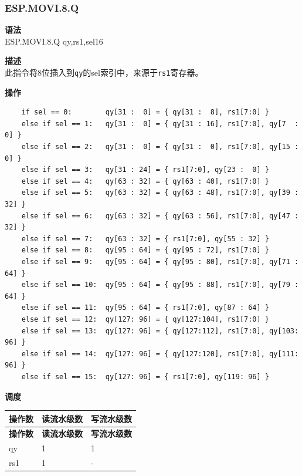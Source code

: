 \newpage

\newpage
\subsubsection{ESP.MOVI.8.Q}\label{instruction:ESPMOVI8Q}
\textbf{语法}\\
ESP.MOVI.8.Q qy,rs1,sel16

\textbf{描述}\\
此指令将8位插入到\lstinline{qy}的sel索引中，来源于\lstinline{rs1}寄存器。

\textbf{操作}\\
\begin{lstlisting}
    if sel == 0:        qy[31 :  0] = { qy[31 :  8], rs1[7:0] }
    else if sel == 1:   qy[31 :  0] = { qy[31 : 16], rs1[7:0], qy[7  :  0] }
    else if sel == 2:   qy[31 :  0] = { qy[31 :  0], rs1[7:0], qy[15 :  0] }
    else if sel == 3:   qy[31 : 24] = { rs1[7:0], qy[23 :  0] }
    else if sel == 4:   qy[63 : 32] = { qy[63 : 40], rs1[7:0] }
    else if sel == 5:   qy[63 : 32] = { qy[63 : 48], rs1[7:0], qy[39 : 32] }
    else if sel == 6:   qy[63 : 32] = { qy[63 : 56], rs1[7:0], qy[47 : 32] }
    else if sel == 7:   qy[63 : 32] = { rs1[7:0], qy[55 : 32] }
    else if sel == 8:   qy[95 : 64] = { qy[95 : 72], rs1[7:0] }
    else if sel == 9:   qy[95 : 64] = { qy[95 : 80], rs1[7:0], qy[71 : 64] }
    else if sel == 10:  qy[95 : 64] = { qy[95 : 88], rs1[7:0], qy[79 : 64] }
    else if sel == 11:  qy[95 : 64] = { rs1[7:0], qy[87 : 64] }
    else if sel == 12:  qy[127: 96] = { qy[127:104], rs1[7:0] }
    else if sel == 13:  qy[127: 96] = { qy[127:112], rs1[7:0], qy[103: 96] }
    else if sel == 14:  qy[127: 96] = { qy[127:120], rs1[7:0], qy[111: 96] }
    else if sel == 15:  qy[127: 96] = { rs1[7:0], qy[119: 96] }
\end{lstlisting}

\textbf{调度}\\
\begin{longtable}[c]{|l|l|l|}
    \hline
    \rowcolor{lightgray}
    \textbf{操作数} & \textbf{读流水级数} & \textbf{写流水级数} \\\hline
    \endfirsthead
    \hline
    \rowcolor{lightgray}
     \textbf{操作数} & \textbf{读流水级数} & \textbf{写流水级数} \\\hline
    \endhead
    \hline
    \endfoot

  qy & 1 & 1 \\\hline
    rs1 & 1 & -

\end{longtable}

